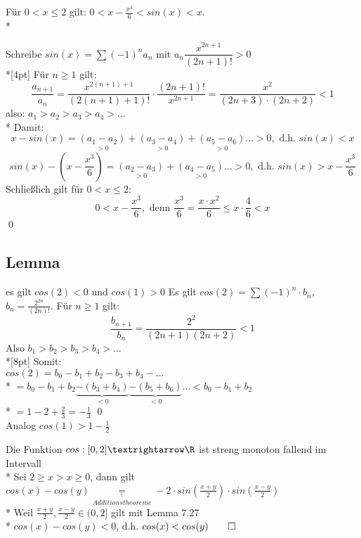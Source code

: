 

Für $0<x\leq 2$ gilt: $0<x-\frac{x^3}{6}<sin(x)<x$.\\*

\bew
Schreibe $sin(x)=\sum(-1)^na_n$ mit $a_n\dfrac{x^{2n+1}}{(2n+1)!}>0$\\*[4pt]
Für $n\geq 1$ gilt: $$\frac{a_{n+1}}{a_n}=\dfrac{x^{2(n+1)+1}}{(2(n+1)+1)!}·\dfrac{(2n+1)!}{x^{2n+1}}=\frac{x^2}{(2n+3)·(2n+2)}<1$$
also: $a_1>a_2>a_3>a_4>…$\\*
Damit: $$x-sin(x)=\underset{>0}{(a_1-a_2)}+\underset{>0}{(a_3-a_4)}+\underset{>0}{(a_5-a_6)}…>0,\text{ d.h. $sin(x)<x$}$$
$$sin(x)-(x-\frac{x^3}{6})=\underset{>0}{(a_2-a_3)}+\underset{>0}{(a_4-a_5)}…>0,\text{ d.h. $sin(x)>x-\frac{x^3}{6}$}$$
Schließlich gilt für $0<x\leq 2$:
$$0<x-\frac{x^3}{6}, \text{ denn } \frac{x^3}{6}=\frac{x·x^2}{6}\leq x·\frac{4}{6}<x$$ \qed

\subsection*{Lemma} es gilt $cos(2) < 0$ und $cos(1) > 0$
\bew
	Es gilt $cos(2) = \sum (-1)^n \cdot b_n$, $b_n = \frac{2^{2n}}{(2n)!}$. Für $n \geq 1$ gilt: 
	$$\frac{b_{n+1}}{b_n} = \frac{2^2}{(2n+1)(2n+2)} < 1$$
	Also $b_1 > b_2 > b_3 > b_4 >…$ \\*[8pt]
	Somit:\\
	$cos(2) = b_0 - b_1 + b_2 - b_3 + b_4 - …$\\*
	$= b_0 - b_1 + b_2 \underbrace{-(b_3 + b_4)}_{<0} \underbrace{-(b_5 + b_6)}_{< 0}… < b_0 - b_1 + b_2$ \\*
	$= 1 - 2 + \frac{2}{3} = - \frac{1}{3}$ \qed\\
	Analog $cos(1) > 1-\frac{1}{2}$

Die Funktion $cos:[0,2]→\R$ ist streng monoton fallend im Intervall\\*
\bew
Sei $2\geq x>x\geq 0$, dann gilt $cos(x)-cos(y)\underset{\overset{\uparrow}{Additionstheoreme}}{=}-2·sin(\frac{x+y}{2})·sin(\frac{x-y}{2})$\\*
Weil $\frac{x+y}{2}, \frac{x-y}{2}\in (0,2]$ gilt mit Lemma 7.27\\*
$cos(x)-cos(y)<0$, d.h. $cos(x)<cos(y)\qed$

